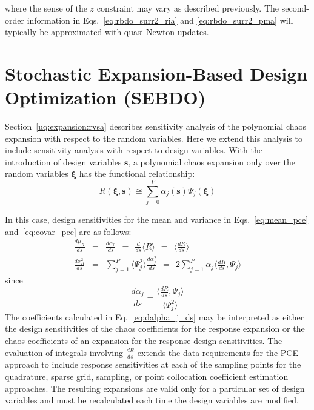 where the sense of the $z$ constraint may vary as described
previously.  The second-order information in
Eqs.~\ref{eq:rbdo_surr2_ria} and \ref{eq:rbdo_surr2_pma} will
typically be approximated with quasi-Newton updates.


\section{Stochastic Expansion-Based Design Optimization (SEBDO)} \label{ouu:sebdo}


Section~\ref{uq:expansion:rvsa} describes sensitivity analysis of the
polynomial chaos expansion with respect to the random variables.  Here
we extend this analysis to include sensitivity analysis with respect
to design variables.  With the introduction of design variables
$\boldsymbol{s}$, a polynomial chaos expansion only over the random
variables $\boldsymbol{\xi}$ has the functional relationship:
\begin{equation}
R(\boldsymbol{\xi}, \boldsymbol{s}) \cong \sum_{j=0}^P \alpha_j(\boldsymbol{s}) 
\Psi_j(\boldsymbol{\xi}) \label{eq:R_alpha_s_psi_xi}
\end{equation}

\noindent In this case, design sensitivities for the mean and variance 
in Eqs.~\ref{eq:mean_pce} and~\ref{eq:covar_pce} are as follows:
\begin{eqnarray}
\frac{d\mu_R}{ds} &=& \frac{d\alpha_0}{ds} 
~~=~~ \frac{d}{ds} \langle R \rangle 
~~=~~ \langle \frac{dR}{ds} \rangle \label{eq:dmuR_ds_unc_pce} \\
\frac{d\sigma^2_R}{ds} &=& \sum_{j=1}^P \langle \Psi_j^2 \rangle 
\frac{d\alpha_j^2}{ds}
~~=~~ 2 \sum_{j=1}^P \alpha_j \langle \frac{dR}{ds}, \Psi_j \rangle 
\label{eq:dsigR_ds_unc_pce}
\end{eqnarray}
since
\begin{equation}
\frac{d\alpha_j}{ds} = \frac{\langle \frac{dR}{ds}, \Psi_j \rangle}
{\langle \Psi^2_j \rangle} \label{eq:dalpha_j_ds}
\end{equation}
The coefficients calculated in Eq.~\ref{eq:dalpha_j_ds} may be
interpreted as either the design sensitivities of the chaos
coefficients for the response expansion or the chaos coefficients of
an expansion for the response design sensitivities.  The evaluation of
integrals involving $\frac{dR}{ds}$ extends the data requirements for
the PCE approach to include response sensitivities at each of the
sampling points for the quadrature, sparse grid, sampling, or point
collocation coefficient estimation approaches.  The resulting
expansions are valid only for a particular set of design variables and
must be recalculated each time the design variables are modified.

